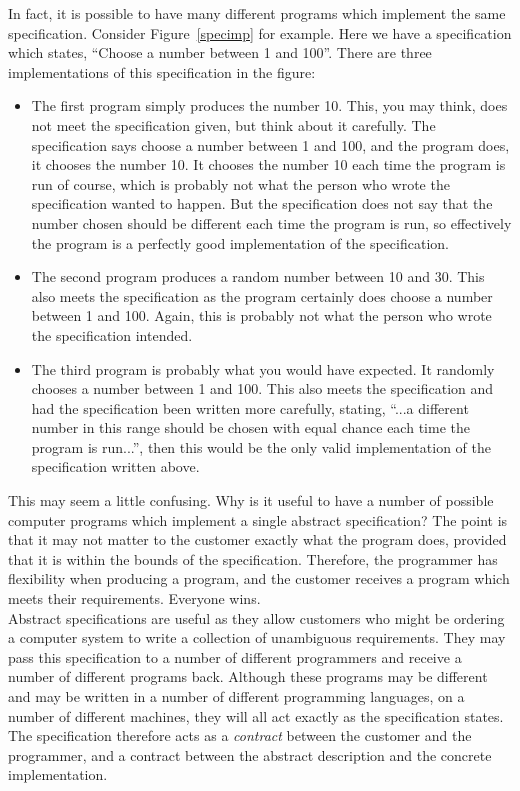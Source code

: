 \noindent
In fact, it is possible to have many different programs 
which implement the same specification. Consider Figure~\ref{specimp} for example.
Here we have a specification which states, ``Choose a number between 1 and 
100''. There are three implementations of this specification in the figure: 

\begin{itemize}

\item
The first program simply produces the number 10. This, you may think, does
not meet the specification given, but think about it carefully. The 
specification says choose a number between 1 and 100, and the program does,
it chooses the number 10. It chooses the number 10 each time the
program is run of course, which 
is probably not what the person who wrote the specification wanted to happen.
But the specification does not say that the number chosen should be different
each time the program is run, so effectively the program is a perfectly 
good implementation of the specification. 

\item
The second program produces a random number between 10 and 30. This also 
meets the specification as the program certainly does choose a number 
between 1 and 100. Again, this is probably not what the person who wrote
the specification intended. 

\item
The third program is probably what you would have expected. It randomly chooses
a number 
between 1 and 100. This also meets the specification and had the 
specification been written more carefully, stating, ``...a different number
in this range should be chosen with equal chance each time the program is 
run...'', then this would be the only valid implementation of the 
specification written above.

\end{itemize}

\noindent
This may seem a little confusing. Why is it useful to have a number of 
possible computer programs which implement a single abstract specification?
The point is
that it may not matter to the customer exactly what the program does,  
provided that it is within the bounds of the specification. Therefore, the 
programmer has flexibility when producing a program, and the customer
receives a program which meets their requirements. Everyone wins. \\

\noindent
Abstract specifications are useful as they allow customers who might
be ordering a computer system to write a collection of unambiguous
requirements. They may pass this specification to a number of different
programmers and receive a number of different programs
back. Although these programs may be different and may be written in a
number of different programming languages, on a number of different
machines, they will all act
exactly as the specification states. The specification therefore acts
as a {\em contract} between the customer and the programmer, and a
contract between the abstract description and the concrete
implementation. 


